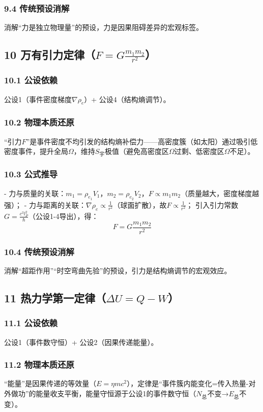 \documentclass{article}
\newcommand{\rhoe}{\rho_e}       %
\newcommand{\et}{\eta}           %
\newcommand{\lp}{l_P}            %
\newcommand{\hb}{\hbar}          %
\newcommand{\Suni}{S_{\text{宇}}}%
\newcommand{\Om}{\Omega}         %
\begin{document}
\subsubsection{9.4 传统预设消解}
消解“力是独立物理量”的预设，力是因果阻碍差异的宏观标签。


\subsection{10 万有引力定律（$F = G \frac{m_1 m_2}{r^2}$）}
\subsubsection{10.1 公设依赖}
公设1（事件密度梯度$\nabla \rhoe$）+ 公设4（结构熵调节）。

\subsubsection{10.2 物理本质还原}
“引力$F$”是事件密度不均引发的结构熵补偿力——高密度簇（如太阳）通过吸引低密度事件，提升全局$\Om$，维持$\Suni$极值（避免高密度区$\Om$过剩、低密度区$\Om$不足）。

\subsubsection{10.3 公式推导}
- 力与质量的关联：$m_1 = \rhoe_1 V_1$，$m_2 = \rhoe_2 V_2$，$F \propto m_1 m_2$（质量越大，密度梯度越强）；  
- 力与距离的关联：$\nabla \rhoe \propto \frac{1}{r^2}$（球面扩散），故$F \propto \frac{1}{r^2}$；  
引入引力常数$G = \frac{c^3 \lp^2}{\hb}$（公设1-4导出），得：  
$$F = G \frac{m_1 m_2}{r^2}$$

\subsubsection{10.4 传统预设消解}
消解“超距作用”“时空弯曲先验”的预设，引力是结构熵调节的宏观效应。


\subsection{11 热力学第一定律（$\Delta U = Q - W$）}
\subsubsection{11.1 公设依赖}
公设1（事件数守恒）+ 公设2（因果传递能量）。

\subsubsection{11.2 物理本质还原}
“能量”是因果传递的等效量（$E = \et m c^2$），定律是“事件簇内能变化=传入热量-对外做功”的能量收支平衡，能量守恒源于公设1的事件数守恒（$N_{\text{总}}$不变→$E_{\text{总}}$不变）。
\end{document}
